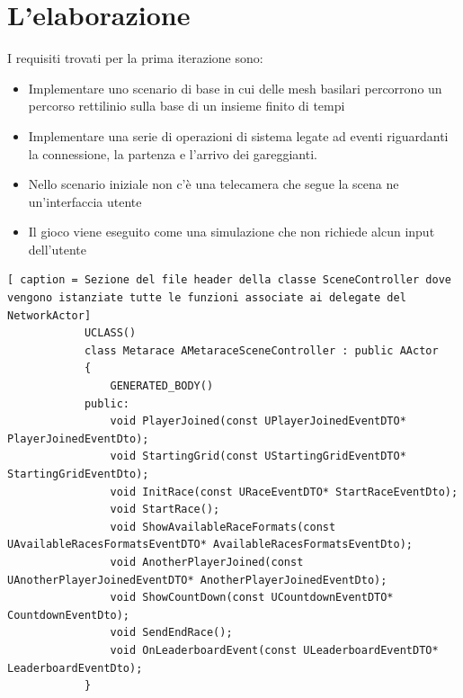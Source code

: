     

    \section{L'elaborazione}

        I requisiti trovati per la prima iterazione sono:
        \begin{itemize}[-]
            \item Implementare uno scenario di base in cui delle mesh basilari percorrono un percorso rettilinio sulla base di un insieme finito di tempi
            \item Implementare una serie di operazioni di sistema legate ad eventi riguardanti la connessione, la partenza e l'arrivo dei gareggianti.
            \item Nello scenario iniziale non c'è una telecamera che segue la scena ne un'interfaccia utente
            \item Il gioco viene eseguito come una simulazione che non richiede alcun input dell'utente
        \end{itemize}

        \begin{lstlisting}[ caption = Sezione del file header della classe SceneController dove vengono istanziate tutte le funzioni associate ai delegate del NetworkActor]
            UCLASS()
            class Metarace AMetaraceSceneController : public AActor
            {
                GENERATED_BODY()
            public:
                void PlayerJoined(const UPlayerJoinedEventDTO* PlayerJoinedEventDto);
                void StartingGrid(const UStartingGridEventDTO* StartingGridEventDto);
                void InitRace(const URaceEventDTO* StartRaceEventDto);
                void StartRace();
                void ShowAvailableRaceFormats(const UAvailableRacesFormatsEventDTO* AvailableRacesFormatsEventDto);
                void AnotherPlayerJoined(const UAnotherPlayerJoinedEventDTO* AnotherPlayerJoinedEventDto);
                void ShowCountDown(const UCountdownEventDTO* CountdownEventDto);
                void SendEndRace();
                void OnLeaderboardEvent(const ULeaderboardEventDTO* LeaderboardEventDto);
            }
                \end{lstlisting}